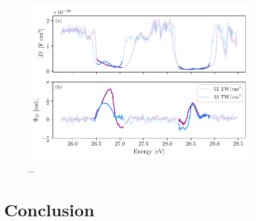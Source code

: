\begin{figure}
	\centering
	\includegraphics[width=0.9\textwidth]{figures/CATS/amp_ph_lineout.pdf}
	\caption[...]{...}
	\label{fig:amp_ph_lineout}
\end{figure}


\section{Conclusion}
\label{sec:CATS_conclusion}